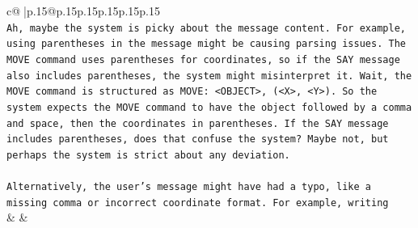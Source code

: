 \documentclass{article}
\begin{document}
{\begin{supertabular}{c@{$\;$}|p{.15\linewidth}@{}p{.15\linewidth}p{.15\linewidth}p{.15\linewidth}p{.15\linewidth}p{.15\linewidth}}
{{{\\ 
\texttt{Ah, maybe the system is picky about the message content. For example, using parentheses in the message might be causing parsing issues. The MOVE command uses parentheses for coordinates, so if the SAY message also includes parentheses, the system might misinterpret it. Wait, the MOVE command is structured as MOVE: <OBJECT>, (<X>, <Y>). So the system expects the MOVE command to have the object followed by a comma and space, then the coordinates in parentheses. If the SAY message includes parentheses, does that confuse the system? Maybe not, but perhaps the system is strict about any deviation.} \\
\\ 
\texttt{Alternatively, the user's message might have had a typo, like a missing comma or incorrect coordinate format. For example, writing} \\
            }
        }
    }
    & & \\ \\


\end{supertabular}}
\end{document}
